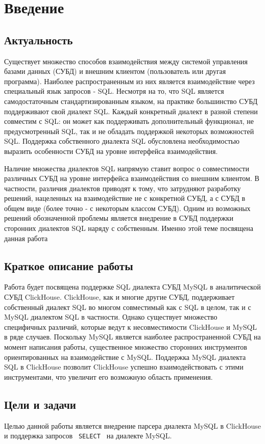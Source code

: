 \section{Введение}
\subsection{Актуальность}
Существует множество способов взаимодействия между системой управления базами данных (СУБД) и внешним клиентом (пользователь или другая программа). Наиболее распространенным из них является взаимодействие через специальный язык запросов - SQL. Несмотря на то, что SQL является самодостаточным стандартизированным языком, на практике большинство СУБД поддерживают свой диалект SQL. Каждый конкретный диалект в разной степени совместим с SQL: он может как поддерживать дополнительный функционал, не предусмотренный SQL, так и не обладать поддержкой некоторых возможностей SQL. Поддержка собственного диалекта SQL обусловлена необходимостью выразить особенности СУБД на уровне интерфейса взаимодействия.

Наличие множества диалектов SQL напрямую ставит вопрос о совместимости различных СУБД на уровне интерфейса взаимодействия со внешним клиентом. В частности, различия диалектов приводят к тому, что затрудняют разработку решений, нацеленных на взаимодействие не с конкретной СУБД, а с СУБД в общем виде (более точно - с некоторым классом СУБД). Одним из возможных решений обозначенной проблемы является внедрение в СУБД поддержки сторонних диалектов SQL наряду с собственным. Именно этой теме посвящена данная работа

\subsection{Краткое описание работы}
Работа будет посвящена поддержке SQL диалекта СУБД MySQL в аналитической СУБД ClickHouse. ClickHouse, как и многие другие СУБД, поддерживает собственный диалект SQL во многом совместимый как с SQL в целом, так и с MySQL диалектом SQL в частности. Однако существует множество специфичных различий, которые ведут к несовместимости ClickHouse и MySQL в ряде случаев. Поскольку MySQL является наиболее распространенной СУБД на момент написания работы, существенное множество сторонних инструментов ориентированных на взаимодействие с MySQL. Поддержка MySQL диалекта SQL в ClickHouse позволит ClickHouse успешно взаимодействовать с этими инструментами, что увеличит его возможную область применения.  

\subsection{Цели и задачи}
Целью данной работы является внедрение парсера диалекта MySQL в ClickHouse и поддержка запросов \texttt{ SELECT } на диалекте MySQL. 

